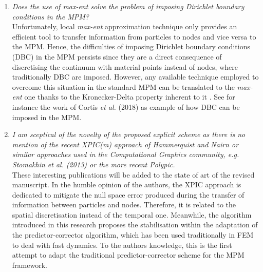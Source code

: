 \documentclass[12pt]{article}
\begin{document}
\begin{enumerate}
Concerning the first issue mentioned by the reviewer, the special case of non-convex domains was discussed by Arroyo \& Ortiz~\cite{Arroyo2006}. Some of the solutions proposed by the aforementioned authors are : the possibility of replacing the Euclidean distance $\lVert  x - x_a  \rVert$ in the definition of the shape functions by the length of the shortest path contained within the domain connecting $x$ and $x_a$. Or the decomposition of the non-convex domain into convex sub-domains.  This topic has also been extensively studied in the context of MLS-based meshfree methods, for instance visibility, diffraction, and constrained path criteria. These methods are directly applicable to local \textit{max-ent} approximation. 


\item \textit{Does the use of max-ent solve the problem of imposing Dirichlet boundary conditions in the MPM?}\\

Unfortunately, local \textit{max-ent} approximation technique only provides an efficient tool to transfer information from particles to nodes and vice versa to the MPM. Hence, the difficulties of imposing Dirichlet boundary conditions (DBC) in the MPM persists since they are a direct consequence of discretising the continuum with material points instead of nodes, where traditionally DBC are imposed. However, any available technique employed to overcome this situation in the standard MPM can be translated to the \textit{max-ent} one thanks to the Kronecker-Delta property inherent to it \cite{Arroyo2006}. See for instance the work of Cortis {\it et al.} (2018) \cite{Cortis_et_al_2017_IJNME} as example of how DBC can be imposed in the MPM.

\item \textit{I am sceptical of the novelty of the proposed explicit scheme as there is no mention of the recent XPIC(m) approach of Hammerquist and Nairn or similar approaches used in the Computational Graphics community, e.g. Stomakhin et al. (2013) or the more recent Polypic.}\\

These interesting publications will be added to the state of art of the revised manuscript. In the humble opinion of the authors, the XPIC approach is dedicated to mitigate the null space error produced during the transfer of information between particles and nodes. Therefore, it is related to the spatial discretisation instead of the temporal one. Meanwhile, the algorithm introduced in this research proposes the stabilisation within the adaptation of the predictor-corrector algorithm, which has been used traditionally in FEM to deal with fast dynamics. To the author\textquotesingle s knowledge, this is the first attempt to adapt the  traditional predictor-corrector scheme for the MPM framework. 

\end{enumerate}
\end{document}
